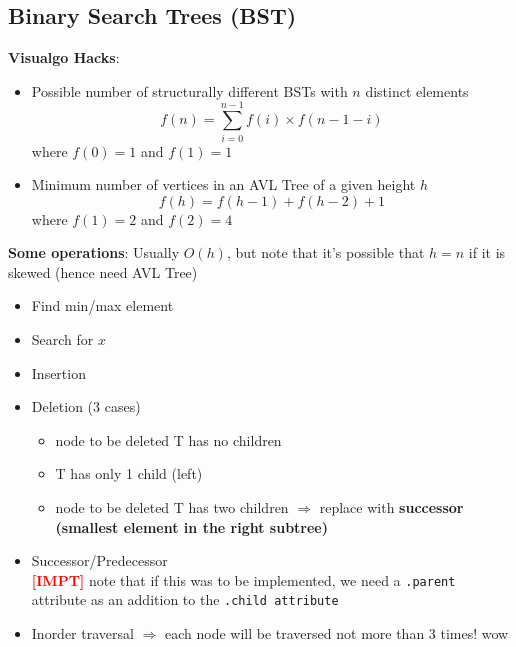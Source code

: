 \documentclass{article}
\newcommand{\impt}[0]{\textcolor{red}{\textbf{[IMPT] }}}
\begin{document}
\begin{multicols}{2}
\subsection{Binary Search Trees (BST)}
\textbf{Visualgo Hacks}:
\begin{itemize}
	\item Possible number of structurally different BSTs with $n$ distinct elements
	$$f(n) = \sum_{i=0}^{n-1}f(i)\times f(n-1-i)$$
	where $f(0) = 1$ and $f(1)=1$
	\item Minimum number of vertices in an AVL Tree of a given height $h$
	$$f(h) = f(h-1) + f(h-2) + 1$$
	where $f(1) = 2$ and $f(2) = 4$
\end{itemize}
\textbf{Some operations}: Usually $O(h)$, but note that it's possible that $h=n$ if it is skewed (hence need AVL Tree)
\begin{itemize}
	\item Find min/max element
	\item Search for $x$
	\item Insertion
	\item Deletion (3 cases)
	\begin{itemize}
		\item node to be deleted T has no children
		\item T has only 1 child (left)
		\item node to be deleted T has two children $\Rightarrow$ replace with \textbf{successor (smallest element in the right subtree)}
	\end{itemize}
    \item Successor/Predecessor\\
    \impt note that if this was to be implemented, we need a \texttt{.parent} attribute as an addition to the \texttt{.child attribute}
    \item Inorder traversal $\Rightarrow$ each node will be traversed not more than 3 times! wow
\end{itemize}


\end{multicols}
\end{document}
